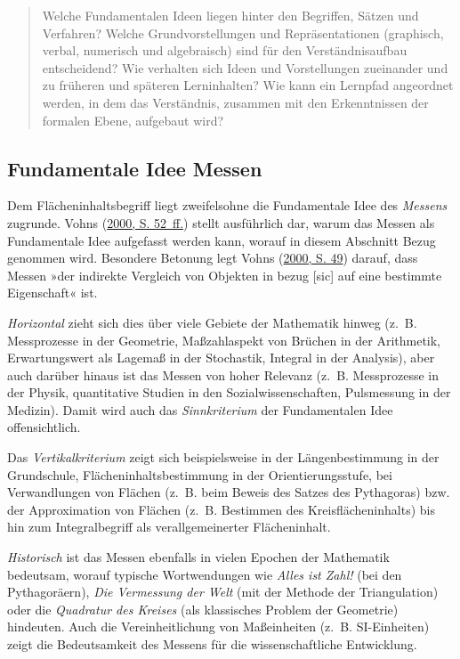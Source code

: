\documentclass[
]{scrbook}
\theoremstyle{definition}
\theoremstyle{definition}
\theoremstyle{definition}
\theoremstyle{definition}
\theoremstyle{remark}
\begin{document}
\begin{quote}
Welche Fundamentalen Ideen liegen hinter den Begriffen, Sätzen und Verfahren?
Welche Grundvorstellungen und Repräsentationen (graphisch, verbal, numerisch und algebraisch) sind für den Verständnisaufbau entscheidend?
Wie verhalten sich Ideen und Vorstellungen zueinander und zu früheren und späteren Lerninhalten?
Wie kann ein Lernpfad angeordnet werden, in dem das Verständnis, zusammen mit den Erkenntnissen der formalen Ebene, aufgebaut wird?
\end{quote}

\hypertarget{fundamentale-idee-messen}{%
\subsection{Fundamentale Idee Messen}\label{fundamentale-idee-messen}}

Dem Flächeninhaltsbegriff liegt zweifelsohne die Fundamentale Idee des \emph{Messens} zugrunde. Vohns (\protect\hyperlink{ref-Vohns:2000}{2000, S. 52~ff.}) stellt ausführlich dar, warum das Messen als Fundamentale Idee aufgefasst werden kann, worauf in diesem Abschnitt Bezug genommen wird. Besondere Betonung legt Vohns (\protect\hyperlink{ref-Vohns:2000}{2000, S. 49}) darauf, dass Messen »der indirekte Vergleich von Objekten in bezug {[}sic{]} auf eine bestimmte Eigenschaft« ist.

\emph{Horizontal} zieht sich dies über viele Gebiete der Mathematik hinweg (z.~B. Messprozesse in der Geometrie, Maßzahlaspekt von Brüchen in der Arithmetik, Erwartungswert als Lagemaß in der Stochastik, Integral in der Analysis), aber auch darüber hinaus ist das Messen von hoher Relevanz (z.~B. Messprozesse in der Physik, quantitative Studien in den Sozialwissenschaften, Pulsmessung in der Medizin). Damit wird auch das \emph{Sinnkriterium} der Fundamentalen Idee offensichtlich.

Das \emph{Vertikalkriterium} zeigt sich beispielsweise in der Längenbestimmung in der Grundschule, Flächeninhaltsbestimmung in der Orientierungsstufe, bei Verwandlungen von Flächen (z.~B. beim Beweis des Satzes des Pythagoras) bzw. der Approximation von Flächen (z.~B. Bestimmen des Kreisflächeninhalts) bis hin zum Integralbegriff als verallgemeinerter Flächeninhalt.

\emph{Historisch} ist das Messen ebenfalls in vielen Epochen der Mathematik bedeutsam, worauf typische Wortwendungen wie \emph{Alles ist Zahl!} (bei den Pythagoräern), \emph{Die Vermessung der Welt} (mit der Methode der Triangulation) oder die \emph{Quadratur des Kreises} (als klassisches Problem der Geometrie) hindeuten. Auch die Vereinheitlichung von Maßeinheiten (z.~B. SI-Einheiten) zeigt die Bedeutsamkeit des Messens für die wissenschaftliche Entwicklung.
\end{document}
